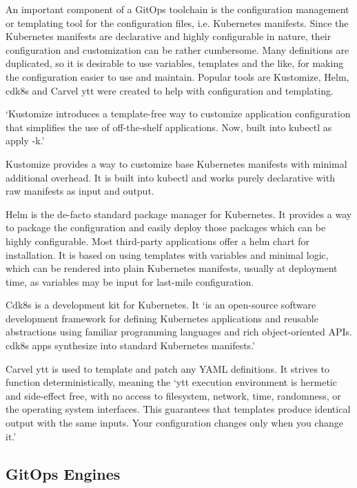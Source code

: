 An important component of a GitOps toolchain is the configuration management or templating tool
for the configuration files, i.e. Kubernetes manifests.
Since the Kubernetes manifests are declarative and highly configurable in nature,
their configuration and customization can be rather cumbersome.
Many definitions are duplicated, so it is desirable to use variables, templates and the like,
for making the configuration easier to use and maintain.
Popular tools are Kustomize, Helm, cdk8s and Carvel ytt were created to help with configuration and templating.

\enquote*{Kustomize introduces a template-free way to customize application configuration that simplifies the use of off-the-shelf applications. Now, built into kubectl as apply -k.}
\autocite{kustomizeIoWebsite}

Kustomize provides a way to customize base Kubernetes manifests with minimal additional overhead.
It is built into kubectl and works purely declarative with raw manifests as input and output.

Helm is the de-facto standard package manager for Kubernetes.
It provides a way to package the configuration and easily deploy those packages
which can be highly configurable.
Most third-party applications offer a helm chart for installation.
It is based on using templates with variables and minimal logic,
which can be rendered into plain Kubernetes manifests, usually at deployment time,
as variables may be input for last-mile configuration.

Cdk8s is a development kit for Kubernetes.
It
\enquote*{is an open-source software development framework for defining Kubernetes applications and reusable abstractions using familiar programming languages and rich object-oriented APIs. cdk8s apps synthesize into standard Kubernetes manifests.}
\autocite{cdk8sWebsite}

Carvel ytt is used to template and patch any YAML definitions.
It strives to function deterministically,
meaning the
\enquote*{ytt execution environment is hermetic and side-effect free, with no access to filesystem, network, time, randomness, or the operating system interfaces. This guarantees that templates produce identical output with the same inputs. Your configuration changes only when you change it.}
\autocite{carvelYttWebsite}









\subsection*{GitOps Engines}

